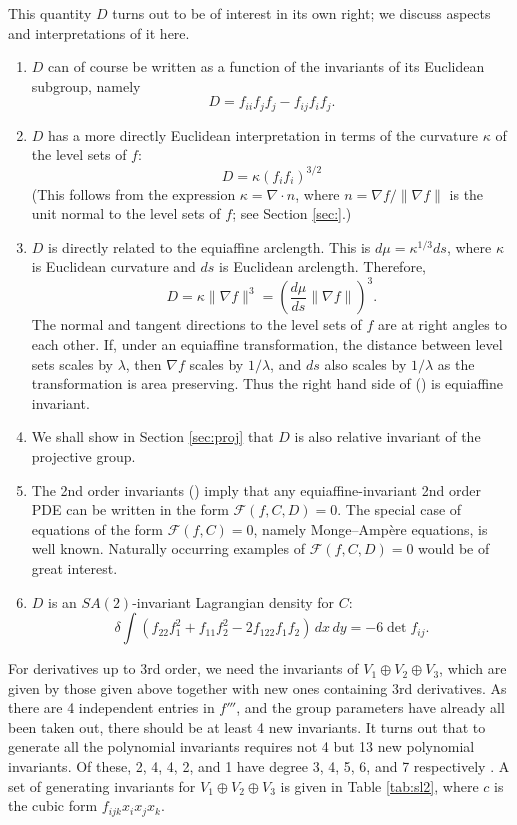 \documentclass{article}
\begin{document}
This quantity $D$ turns out to be of interest in its own right; we discuss aspects and interpretations of it here.
\begin{enumerate}
\item $D$ can of course be written as a function
of the invariants of its Euclidean subgroup, namely
$$D = f_{ii} f_j f_j - f_{ij}f_i f_j.$$
\item
$D$ has a more directly Euclidean interpretation in terms of the curvature $\kappa$ of the level sets of $f$:
$$ D = \kappa (f_i f_i)^{3/2}$$
(This follows from the expression $\kappa = \nabla\cdot n$, where $n=\nabla f/\|\nabla f\|$ is the 
unit normal to the level sets of $f$; see Section \ref{sec:}.)
\item
$D$ is directly related to the equiaffine arclength. This is $d\mu = \kappa^{1/3}ds$, where
$\kappa$ is Euclidean curvature and $ds$ is Euclidean arclength. Therefore,
$$ D = \kappa \|\nabla f\|^3 = \left(\frac{d\mu}{ds}\|\nabla f\|\right)^3.$$
The normal and tangent directions to the level sets of $f$ are at right angles
to each other. If, under an equiaffine transformation, the distance
between level sets scales by $\lambda$, then $\nabla f$ scales by $1/\lambda$, 
and $ds$ also scales by $1/\lambda$ as the transformation is area preserving.
Thus the right hand side of () is equiaffine invariant.
\item We shall show in Section \ref{sec:proj} that $D$ is also relative invariant of the projective group.
\item The 2nd order invariants () imply that any equiaffine-invariant 2nd order PDE can be written in the form
$\mathcal{F}(f, C, D)=0$.
The special case of equations of the form $\mathcal{F}(f,C)=0$, namely Monge--Amp\`ere equations, is well known.
Naturally occurring examples of $\mathcal{F}(f,C,D)=0$ would be of great interest.
\item $D$ is an $SA(2)$-invariant Lagrangian density for $C$:
$$ \delta\int \left(f_{22}f_1^2 + f_{11}f_2^2 - 2 f_{122} f_1 f_2\right) \, dx\, dy = - 6\det f_{ij}.$$
\end{enumerate}

For derivatives up to 3rd order, we need the invariants of $V_1\oplus V_2\oplus V_3$, which are
given by those given above together with new ones containing 3rd derivatives. As there are 4 independent
entries in $f'''$, and the group parameters have already all been taken out, there should be at least 4 new invariants. It turns out that to generate all the polynomial invariants requires not 4 but 13 new polynomial invariants.
Of these, 2, 4, 4, 2, and 1 have degree 3, 4, 5, 6, and 7 respectively \cite{draisma}.
A set of generating invariants for $V_1\oplus V_2\oplus V_3$ is given in Table \ref{tab:sl2},
where  $c$ is the cubic form $f_{ijk}x_i x_j x_k$. 
\end{document}
